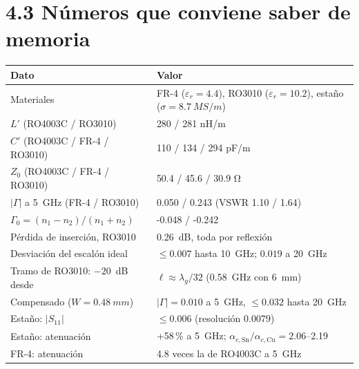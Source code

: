 \documentclass[11pt,letterpaper]{article}
\begin{document}
\section*{4.3 Números que conviene saber de memoria}
\begin{center}
\small
\begin{tabular}{ll}
\toprule
Dato & Valor \\
\midrule
Materiales & FR-4 ($\varepsilon_r=4.4$), RO3010 ($\varepsilon_r=10.2$), estaño ($\sigma=\SI{8.7}{MS/m}$) \\
$L'$ (RO4003C / RO3010) & 280 / 281 nH/m \\
$C'$ (RO4003C / FR-4 / RO3010) & 110 / 134 / 294 pF/m \\
$Z_0$ (RO4003C / FR-4 / RO3010) & 50.4 / 45.6 / 30.9 \si{\ohm} \\
$|\Gamma|$ a \SI{5}{GHz} (FR-4 / RO3010) & 0.050 / 0.243 (VSWR 1.10 / 1.64) \\
$\Gamma_0=(n_1-n_2)/(n_1+n_2)$ & -0.048 / -0.242 \\
Pérdida de inserción, RO3010 & \SI{0.26}{dB}, toda por reflexión \\
Desviación del escalón ideal & $\leq 0.007$ hasta \SI{10}{GHz}; $0.019$ a \SI{20}{GHz} \\
Tramo de RO3010: $-20$~dB desde & $\ell\approx\lambda_g/32$ (\SI{0.58}{GHz} con \SI{6}{mm}) \\
Compensado ($W=\SI{0.48}{mm}$) & $|\Gamma|=0.010$ a \SI{5}{GHz}, $\leq 0.032$ hasta \SI{20}{GHz} \\
Estaño: $|S_{11}|$ & $\leq 0.006$ (resolución 0.0079) \\
Estaño: atenuación & +58\,\% a \SI{5}{GHz}; $\alpha_{c,\mathrm{Sn}}/\alpha_{c,\mathrm{Cu}}=2.06$--2.19 \\
FR-4: atenuación & 4.8 veces la de RO4003C a \SI{5}{GHz} \\
\bottomrule
\end{tabular}
\end{center}
\end{document}
